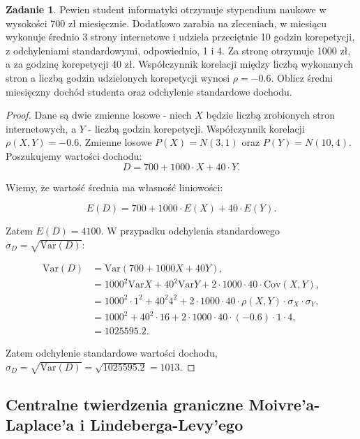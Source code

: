 \documentclass[11pt]{article}
\theoremstyle{definition}
\newtheorem{zadanie}{Zadanie}
\newcommand{\Var}{\text{Var}}
\newcommand{\Cov}{\text{Cov}}
\begin{document}
\begin{zadanie}
    Pewien student informatyki otrzymuje stypendium naukowe w wysokości 700 zł miesięcznie. Dodatkowo zarabia na zleceniach, w miesiącu wykonuje średnio 3 strony internetowe i udziela przeciętnie 10 godzin korepetycji, z odchyleniami standardowymi, odpowiednio, 1 i 4. Za stronę otrzymuje 1000 zł, a za godzinę korepetycji 40 zł. Współczynnik
    korelacji między liczbą wykonanych stron a liczbą godzin udzielonych korepetycji wynosi $\rho = -0.6$. Oblicz średni miesięczny dochód studenta oraz odchylenie standardowe dochodu.
\end{zadanie}
\begin{proof}
    Dane są dwie zmienne losowe - niech $X$ będzie liczbą zrobionych stron internetowych, a $Y$ - liczbą godzin korepetycji. Współczynnik korelacji $\rho(X,Y)=-0.6$. Zmienne losowe $P(X) = N(3,1)$ oraz $P(Y) = N(10, 4)$. Poszukujemy wartości dochodu:
    $$D = 700 + 1000\cdot X+40\cdot Y.$$

    Wiemy, że wartość średnia ma własność liniowości:

    $$E(D) = 700+1000\cdot E(X) + 40\cdot E(Y).$$

    Zatem $E(D) = 4100$. W przypadku odchylenia standardowego $\sigma_D = \sqrt{\text{Var}(D)}$:

    \begin{align*}
        \Var(D) & = \Var(700+1000X+40Y),                                                                   \\
                & = 1000^2\Var X+40^2 \Var Y+2\cdot 1000\cdot 40\cdot \Cov(X,Y),                           \\
                & = 1000^2\cdot 1^2+40^2 4^2+2\cdot 1000\cdot 40\cdot \rho(X,Y)\cdot\sigma_X\cdot\sigma_Y, \\
                & = 1000^2+40^2 \cdot 16+2\cdot 1000\cdot 40\cdot (-0.6)\cdot1\cdot4,                      \\
                & =1025595.2.
    \end{align*}

    Zatem odchylenie standardowe wartości dochodu, $\sigma_D = \sqrt{\Var(D)} = \sqrt{1025595.2} = 1013$.

\end{proof}

\subsection{Centralne twierdzenia graniczne Moivre'a-Laplace'a i Lindeberga-Levy'ego}
\end{document}
